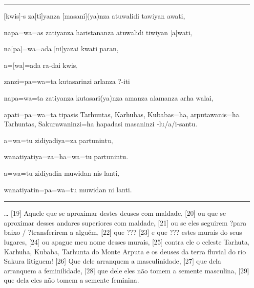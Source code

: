 \vspace{10pt}
\hrule
\vspace{10pt}


\setcounter{parcount}{18}
\begin{parnumbersa}[]

	\raggedright%
	\itshape%



	$[$kwis$]$-s za$[$ti$]$yanza $[$masani$]${(ya)}nza atuwalidi
	tawiyan awati,

	napa=wa=as zatiyanza haristananza atuwalidi tiwiyan $[$a$]$wati,

	na$[$pa$]$=wa=ada $[$ni$]$yazai kwati paran,

	a=$[$wa$]$=ada ra-dai kwis,

	zanzi=pa=wa=ta kutasarinzi arlanza {?}-iti

	napa=wa=ta zatiyanza kutasari{(ya)}nza amanza alamanza arha walai,

	apati=pa=wa=ta tipasis Tarhuntas, Karhuhas, Kubabas=ha, arputawanis=ha
	Tarhuntas, Sakurawaninzi=ha hapadasi masaninzi -lu/a/i-santu.

	a=wa=tu zidiyadiya=za partunintu,

	wanatiyatiya=za=ha=wa=tu partunintu.

	a=wa=tu zidiyadin muwidan nis lanti,

	wanatiyatin=pa=wa=tu muwidan ni lanti.

\end{parnumbersa}

\vspace{10pt}
\hrule
\vspace{10pt}



\ldots{}
[19] Aquele que se aproximar destes deuses com maldade,
[20] ou que se aproximar desses andares superiores com maldade,
[21] ou se eles seguirem {?}para baixo / {?}transferirem a alguém,
[22] que {???}
	[23] e que {???} estes murais do seus lugares,
[24] ou apague meu nome desses murais,
[25] contra ele o celeste Tarhuta, Karhuha, Kubaba, Tarhunta do Monte Arputa e
os deuses da terra fluvial do rio Sakura litiguem!
[26] Que dele arranquem a masculinidade,
[27] que dela arranquem a feminilidade,
[28] que dele eles não tomem a semente masculina,
[29] que dela eles não tomem a semente feminina.

\clearpage

